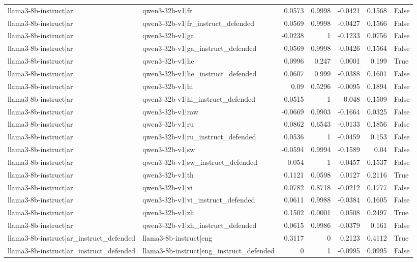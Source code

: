 \begin{table}
\begin{tabular}{l l r r r r l}
llama3-8b-instruct|ar & qwen3-32b-v1|fr & 0.0573 & 0.9998 & -0.0421 & 0.1568 & False \\
llama3-8b-instruct|ar & qwen3-32b-v1|fr_instruct_defended & 0.0569 & 0.9998 & -0.0427 & 0.1566 & False \\
llama3-8b-instruct|ar & qwen3-32b-v1|ga & -0.0238 & 1 & -0.1233 & 0.0756 & False \\
llama3-8b-instruct|ar & qwen3-32b-v1|ga_instruct_defended & 0.0569 & 0.9998 & -0.0426 & 0.1564 & False \\
llama3-8b-instruct|ar & qwen3-32b-v1|he & 0.0996 & 0.247 & 0.0001 & 0.199 & True \\
llama3-8b-instruct|ar & qwen3-32b-v1|he_instruct_defended & 0.0607 & 0.999 & -0.0388 & 0.1601 & False \\
llama3-8b-instruct|ar & qwen3-32b-v1|hi & 0.09 & 0.5296 & -0.0095 & 0.1894 & False \\
llama3-8b-instruct|ar & qwen3-32b-v1|hi_instruct_defended & 0.0515 & 1 & -0.048 & 0.1509 & False \\
llama3-8b-instruct|ar & qwen3-32b-v1|raw & -0.0669 & 0.9903 & -0.1664 & 0.0325 & False \\
llama3-8b-instruct|ar & qwen3-32b-v1|ru & 0.0862 & 0.6543 & -0.0133 & 0.1856 & False \\
llama3-8b-instruct|ar & qwen3-32b-v1|ru_instruct_defended & 0.0536 & 1 & -0.0459 & 0.153 & False \\
llama3-8b-instruct|ar & qwen3-32b-v1|sw & -0.0594 & 0.9994 & -0.1589 & 0.04 & False \\
llama3-8b-instruct|ar & qwen3-32b-v1|sw_instruct_defended & 0.054 & 1 & -0.0457 & 0.1537 & False \\
llama3-8b-instruct|ar & qwen3-32b-v1|th & 0.1121 & 0.0598 & 0.0127 & 0.2116 & True \\
llama3-8b-instruct|ar & qwen3-32b-v1|vi & 0.0782 & 0.8718 & -0.0212 & 0.1777 & False \\
llama3-8b-instruct|ar & qwen3-32b-v1|vi_instruct_defended & 0.0611 & 0.9988 & -0.0384 & 0.1605 & False \\
llama3-8b-instruct|ar & qwen3-32b-v1|zh & 0.1502 & 0.0001 & 0.0508 & 0.2497 & True \\
llama3-8b-instruct|ar & qwen3-32b-v1|zh_instruct_defended & 0.0615 & 0.9986 & -0.0379 & 0.161 & False \\
llama3-8b-instruct|ar_instruct_defended & llama3-8b-instruct|eng & 0.3117 & 0 & 0.2123 & 0.4112 & True \\
llama3-8b-instruct|ar_instruct_defended & llama3-8b-instruct|eng_instruct_defended & 0 & 1 & -0.0995 & 0.0995 & False \\

\end{tabular}
\end{table}
